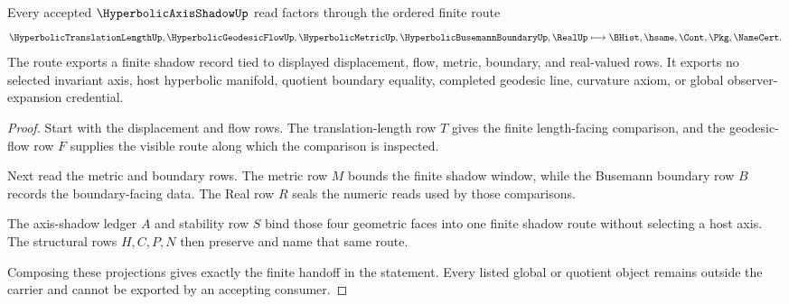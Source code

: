 \begin{theorem}
\label{thm:hyperbolic-axis-shadow-route}
Every accepted $\HyperbolicAxisShadowUp$ read factors through the ordered finite route
$$
\HyperbolicTranslationLengthUp,\HyperbolicGeodesicFlowUp,\HyperbolicMetricUp,\HyperbolicBusemannBoundaryUp,\RealUp
\longmapsto
\BHist,\hsame,\Cont,\Pkg,\NameCert .
$$
The route exports a finite shadow record tied to displayed displacement, flow, metric, boundary, and real-valued rows. It exports no selected invariant axis, host hyperbolic manifold, quotient boundary equality, completed geodesic line, curvature axiom, or global observer-expansion credential.
\end{theorem}
\begin{proof}
Start with the displacement and flow rows. The translation-length row $T$ gives the finite length-facing comparison, and the geodesic-flow row $F$ supplies the visible route along which the comparison is inspected.

Next read the metric and boundary rows. The metric row $M$ bounds the finite shadow window, while the Busemann boundary row $B$ records the boundary-facing data. The Real row $R$ seals the numeric reads used by those comparisons.

The axis-shadow ledger $A$ and stability row $S$ bind those four geometric faces into one finite shadow route without selecting a host axis. The structural rows $H,C,P,N$ then preserve and name that same route.

Composing these projections gives exactly the finite handoff in the statement. Every listed global or quotient object remains outside the carrier and cannot be exported by an accepting consumer.
\end{proof}



